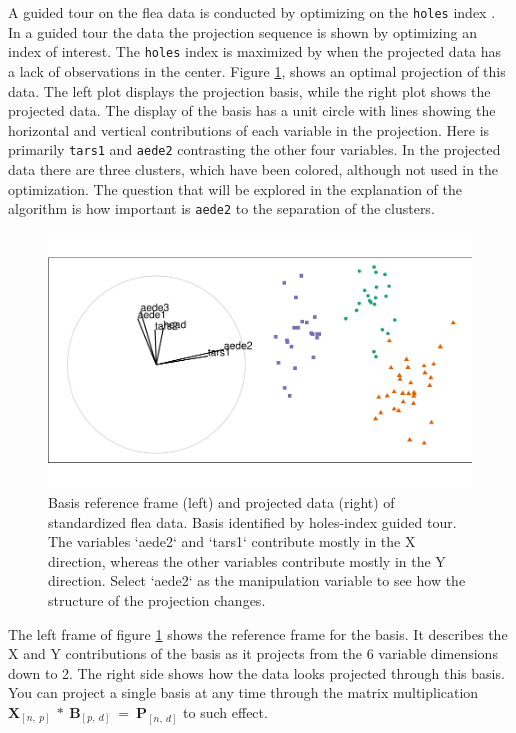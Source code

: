 \documentclass{monashthesis}
\begin{document}
A guided tour on the flea data is conducted by optimizing on the
\texttt{holes} index \autocite{cook_interactive_2007}. In a guided tour
the data the projection sequence is shown by optimizing an index of
interest. The \texttt{holes} index is maximized by when the projected
data has a lack of observations in the center. Figure \ref{fig:step0},
shows an optimal projection of this data. The left plot displays the
projection basis, while the right plot shows the projected data. The
display of the basis has a unit circle with lines showing the horizontal
and vertical contributions of each variable in the projection. Here is
primarily \texttt{tars1} and \texttt{aede2} contrasting the other four
variables. In the projected data there are three clusters, which have
been colored, although not used in the optimization. The question that
will be explored in the explanation of the algorithm is how important is
\texttt{aede2} to the separation of the clusters.

\begin{figure}

{\centering \includegraphics[width=0.98\linewidth]{thesis_files/figure-latex/step0-1} 

}

\caption{Basis reference frame (left) and projected data (right) of standardized flea data. Basis identified by holes-index guided tour. The variables `aede2` and `tars1` contribute mostly in the X direction, whereas the other variables contribute mostly in the Y direction. Select `aede2` as the manipulation variable to see how the structure of the projection changes.}\label{fig:step0}
\end{figure}

The left frame of figure \ref{fig:step0} shows the reference frame for
the basis. It describes the X and Y contributions of the basis as it
projects from the 6 variable dimensions down to 2. The right side shows
how the data looks projected through this basis. You can project a
single basis at any time through the matrix multiplication
\(\textbf{X}_{[n,~p]} ~*~ \textbf{B}_{[p,~d]} ~=~ \textbf{P}_{[n,~d]}\)
to such effect.
\end{document}
